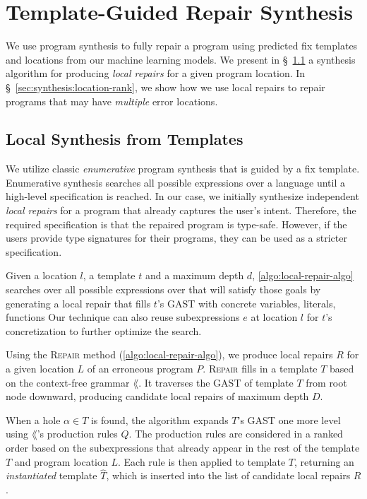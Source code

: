 \section{Template-Guided Repair Synthesis}
\label{sec:synthesis}
We use program synthesis to fully repair a program using predicted fix templates
and locations from our machine learning models. We present in
\S~\ref{sec:synthesis:local-synthesis} a synthesis algorithm for producing
\emph{local repairs} for a given program location. In
\S~\ref{sec:synthesis:location-rank}, we show how we use local repairs to repair
programs that may have \emph{multiple} error locations.

\lstMakeShortInline[mathescape=true]{|}

\subsection{Local Synthesis from Templates}
\label{sec:synthesis:local-synthesis}

We utilize classic \emph{enumerative} program synthesis that is guided by a fix
template. Enumerative synthesis searches all possible expressions over a
language until a high-level specification is reached. In our case, we initially
synthesize independent \emph{local repairs} for a program that already captures
the user's intent. Therefore, the required specification is that the repaired
program is type-safe. However, if the users provide type signatures for their
programs, they can be used as a stricter specification.

Given a location $l$, a template $t$ and a maximum depth $d$,
\autoref{algo:local-repair-algo} searches over all possible expressions over
\lang that will satisfy those goals by generating a local repair that fills
$t$'s GAST with concrete variables, literals, functions \etc Our technique can
also reuse subexpressions $e$ at location $l$ for $t$'s concretization to
further optimize the search.



Using the \textsc{Repair} method (\autoref{algo:local-repair-algo}), we produce
local repairs $R$ for a given location $L$ of an erroneous program $P$.
\textsc{Repair} fills in a template $T$ based on the context-free grammar
$\lang$. It traverses the GAST of template $T$ from root node
downward, producing candidate local repairs of maximum depth $D$.

When a hole $\alpha \in T$ is found, the algorithm expands $T$'s GAST one more
level using $\lang$'s production rules $Q$. The production rules are considered
in a ranked order based on the subexpressions that already appear in the rest
of the template $T$ and program location $L$. Each rule is then applied to
template $T$, returning an \emph{instantiated} template $\hat{T}$, which is
inserted into the list of candidate local repairs $R$.

